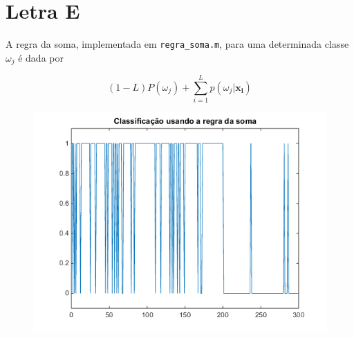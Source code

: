 \documentclass[12pt,twoside]{report}
\newcommand{\code}[1]{\texttt{#1}}
\begin{document}
\section*{Letra E}

A regra da soma, implementada em \code{regra\_soma.m}, para uma determinada classe
$\omega_j$ é dada por

\begin{equation}
(1 - L) P(\omega_j) + \sum_{i=1}^L p(\omega_j|\mathbf{x_i})
\label{eq:sum_prob_posteriori}
\end{equation}

\begin{figure}[ht]
    \centering
    \includegraphics[scale=0.75]{sum_rule}
    \caption{}
    \label{fig:sum_rule}
\end{figure}


\printbibliography
\end{document}
